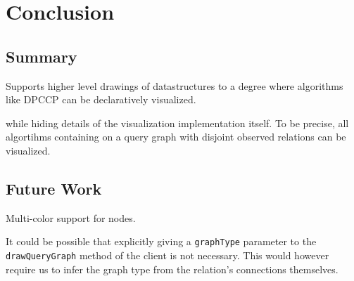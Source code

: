 \section{Conclusion}

\subsection{Summary}

Supports higher level drawings of datastructures to a degree where algorithms like DPCCP can be declaratively visualized.

while hiding details of the visualization implementation itself.
To be precise, all algortihms containing on a query graph with disjoint observed relations can be visualized.

\subsection{Future Work}

Multi-color support for nodes.

It could be possible that explicitly giving a \texttt{graphType} parameter to the \texttt{drawQueryGraph} method of the client is not necessary. This would however require us to infer the graph type from the relation's connections themselves.